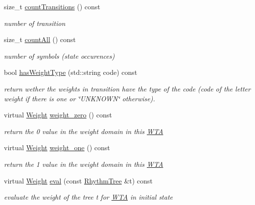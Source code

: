 \begin{DoxyCompactItemize}
size\+\_\+t \mbox{\hyperlink{group__schemata_ga8acbd7562a6f69e7634d6b9f9e341e4a}{count\+Transitions}} () const
\begin{DoxyCompactList}\small\item\em number of transition \end{DoxyCompactList}\item 
size\+\_\+t \mbox{\hyperlink{group__schemata_ga9370cdd31619d49bfb0b18fa6b4e13b7}{count\+All}} () const
\begin{DoxyCompactList}\small\item\em number of symbols (state occurences) \end{DoxyCompactList}\item 
bool \mbox{\hyperlink{group__schemata_gaf3c11e99698a2cf7ef039632dc5e2b6b}{has\+Weight\+Type}} (std\+::string code) const
\begin{DoxyCompactList}\small\item\em return wether the weights in transition have the type of the code (code of the letter weight if there is one or \char`\"{}\+U\+N\+K\+N\+O\+W\+N\char`\"{} otherwise). \end{DoxyCompactList}\item 
virtual \mbox{\hyperlink{classWeight}{Weight}} \mbox{\hyperlink{group__schemata_ga762b5bbee46468815993417ca9b3d9c6}{weight\+\_\+zero}} () const
\begin{DoxyCompactList}\small\item\em return the 0 value in the weight domain in this \mbox{\hyperlink{classWTA}{W\+TA}} \end{DoxyCompactList}\item 
virtual \mbox{\hyperlink{classWeight}{Weight}} \mbox{\hyperlink{group__schemata_gabfe48e6398d83c03161b664dadcf8fcd}{weight\+\_\+one}} () const
\begin{DoxyCompactList}\small\item\em return the 1 value in the weight domain in this \mbox{\hyperlink{classWTA}{W\+TA}} \end{DoxyCompactList}\item 
virtual \mbox{\hyperlink{classWeight}{Weight}} \mbox{\hyperlink{group__schemata_gaa6598176fb91c70988bea7cf824ec157}{eval}} (const \mbox{\hyperlink{classRhythmTree}{Rhythm\+Tree}} \&t) const
\begin{DoxyCompactList}\small\item\em evaluate the weight of the tree t for \mbox{\hyperlink{classWTA}{W\+TA}} in initial state \end{DoxyCompactList}\item 

\end{DoxyCompactItemize}
